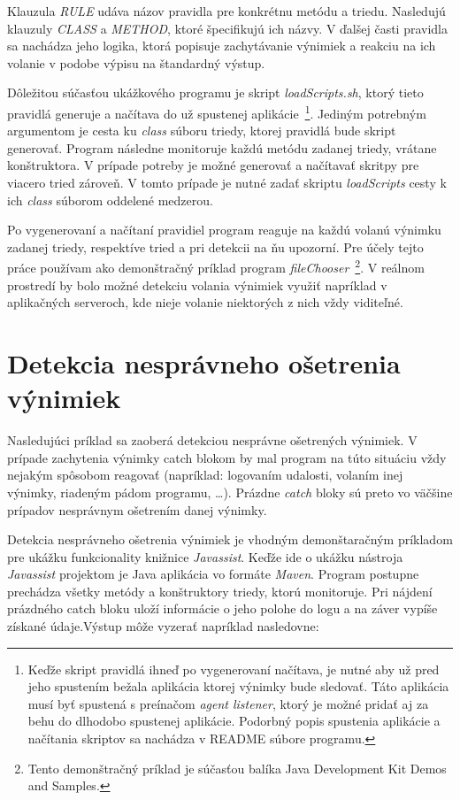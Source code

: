 \documentclass[11pt,final,oneside]{fithesis}
\begin{document}
Klauzula \textit{RULE} udáva názov pravidla pre konkrétnu metódu a triedu. Nasledujú klauzuly \textit{CLASS} a \textit{METHOD}, ktoré špecifikujú ich názvy. V ďalšej časti pravidla sa nachádza jeho logika, ktorá popisuje zachytávanie výnimiek a reakciu na ich volanie v podobe výpisu na štandardný výstup.

Dôležitou súčasťou ukážkového programu je skript \textit{loadScripts.sh}, ktorý tieto pravidlá generuje a načítava do už spustenej aplikácie~\footnote{Keďže skript pravidlá ihneď po vygenerovaní načítava, je nutné aby už pred jeho spustením bežala aplikácia ktorej výnimky bude sledovať. Táto aplikácia musí byť spustená s preínačom \textit{agent listener}, ktorý je možné pridať aj za behu do dlhodobo spustenej aplikácie. Podorbný popis spustenia aplikácie a načítania skriptov sa nachádza v README súbore programu.}. Jediným potrebným argumentom je cesta ku \textit{class} súboru triedy, ktorej pravidlá bude skript generovať. Program následne monitoruje každú metódu zadanej triedy, vrátane konštruktora. V prípade potreby je možné generovať a načítavať skritpy pre viacero tried zároveň. V tomto prípade je nutné zadať skriptu \textit{loadScripts} cesty k ich \textit{class} súborom oddelené medzerou.

Po vygenerovaní a načítaní pravidiel program reaguje na každú volanú výnimku zadanej triedy, respektíve tried a pri detekcii na ňu upozorní. Pre účely tejto práce používam ako demonštračný príklad program \textit{fileChooser}~\footnote{Tento demonštračný príklad je súčasťou balíka Java Development Kit Demos and Samples.}. V reálnom prostredí by bolo možné detekciu volania výnimiek využiť napríklad v aplikačných serveroch, kde nieje volanie niektorých z nich vždy viditeľné.

\section{Detekcia nesprávneho ošetrenia výnimiek}

Nasledujúci príklad sa zaoberá detekciou nesprávne ošetrených výnimiek. V prípade zachytenia výnimky catch blokom by mal program na túto situáciu vždy nejakým spôsobom reagovať (napríklad: logovaním udalosti, volaním inej výnimky, riadeným pádom programu, …). Prázdne \textit{catch} bloky sú preto vo väčšine prípadov nesprávnym ošetrením danej výnimky.

Detekcia nesprávneho ošetrenia výnimiek je vhodným demonštaračným príkladom pre ukážku funkcionality knižnice \textit{Javassist}. Keďže ide o ukážku nástroja \textit{Javassist} projektom je Java aplikácia vo formáte \textit{Maven}. Program postupne prechádza všetky metódy a konštruktory triedy, ktorú monitoruje. Pri nájdení prázdného catch bloku uloží informácie o jeho polohe do logu a na záver vypíše získané údaje.Výstup môže vyzerať napríklad nasledovne:
\end{document}
